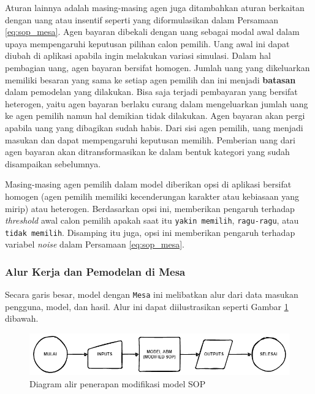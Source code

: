 Aturan lainnya adalah masing-masing agen juga ditambahkan aturan berkaitan dengan uang atau insentif seperti yang diformulasikan dalam Persamaan \ref{eq:sop_mesa}. Agen bayaran dibekali dengan uang sebagai modal awal dalam upaya mempengaruhi keputusan pilihan calon pemilih. Uang awal ini dapat diubah di aplikasi apabila ingin melakukan variasi simulasi. Dalam hal pembagian uang, agen bayaran bersifat homogen. Jumlah uang yang dikeluarkan memiliki besaran yang sama ke setiap agen pemilih dan ini menjadi \textbf{batasan} dalam pemodelan yang dilakukan. Bisa saja terjadi pembayaran yang bersifat heterogen, yaitu agen bayaran berlaku curang dalam mengeluarkan jumlah uang ke agen pemilih namun hal demikian tidak dilakukan. Agen bayaran akan pergi apabila uang yang dibagikan sudah habis. Dari sisi agen pemilih, uang menjadi masukan dan dapat mempengaruhi keputusan memilih. Pemberian uang dari agen bayaran akan ditransformasikan ke dalam bentuk kategori yang sudah disampaikan sebelumnya.

Masing-masing agen pemilih dalam model diberikan opsi di aplikasi bersifat homogen (agen pemilih memiliki kecenderungan karakter atau kebiasaan yang mirip) atau heterogen. Berdasarkan opsi ini, memberikan pengaruh terhadap \textit{threshold} awal calon pemilih apakah saat itu \texttt{yakin memilih}, \texttt{ragu-ragu}, atau \texttt{tidak memilih}. Disamping itu juga, opsi ini memberikan pengaruh terhadap variabel \textit{noise} dalam Persamaan \ref{eq:sop_mesa}.

\subsubsection{Alur Kerja dan Pemodelan di Mesa}\label{sec:sbab_alurkerja}

Secara garis besar, model dengan \texttt{Mesa} ini melibatkan alur dari data masukan pengguna, model, dan hasil. Alur ini dapat diilustrasikan seperti Gambar \ref{fig:flowsopabm} dibawah.

\begin{figure}[H]
\centering
\includegraphics[width=\linewidth]{images/ch02/FlowSopAbm}
\caption{Diagram alir penerapan modifikasi model SOP}
\label{fig:flowsopabm}
\end{figure}


